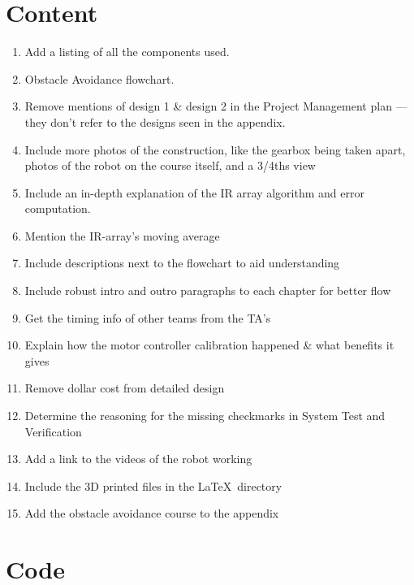 \documentclass[11pt]{article}
\begin{document}
\section{Content}
\begin{enumerate}
    \item Add a listing of all the components used.
    \item Obstacle Avoidance flowchart.
    \item Remove mentions of design 1 \& design 2 in the Project Management plan --- they don't refer to the designs seen in the appendix.
    \item Include more photos of the construction, like the gearbox being taken apart, photos of the robot on the course itself, and a 3/4ths view
    \item Include an in-depth explanation of the IR array algorithm and error computation. 
    \item Mention the IR-array's moving average
    \item Include descriptions next to the flowchart to aid understanding
    \item Include robust intro and outro paragraphs to each chapter for better flow
    \item Get the timing info of other teams from the TA's
    \item Explain how the motor controller calibration happened \& what benefits it gives
    \item Remove dollar cost from detailed design
    \item Determine the reasoning for the missing checkmarks in System Test and Verification
    \item Add a link to the videos of the robot working
    \item Include the 3D printed files in the \LaTeX \ directory
    \item Add the obstacle avoidance course to the appendix
\end{enumerate}

\section{Code}
\end{document}
